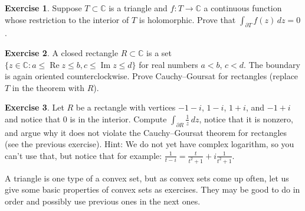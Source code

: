 \documentclass[12pt,openany]{book}
\renewcommand{\Re}{\operatorname{Re}}
\renewcommand{\Im}{\operatorname{Im}}
\newcommand{\C}{{\mathbb{C}}}
\theoremstyle{plain}
\theoremstyle{remark}
\theoremstyle{definition}
\newenvironment{exbox}{%
    \def\FrameCommand{\vrule width 1pt \relax\hspace {10pt}}%
    \MakeFramed {\advance \hsize -\width \FrameRestore }%
}{%
    \endMakeFramed
}
\theoremstyle{exercise}
\newtheorem{exercise}{Exercise}[section]
\theoremstyle{example}
\begin{document}
\begin{exbox}
\begin{exercise}
Suppose $T \subset \C$ is a triangle and $f \colon T \to \C$ a
continuous function whose restriction to the interior of $T$ is holomorphic.
Prove that $\int_{\partial T} f(z) \, dz = 0$.
\end{exercise}

\begin{exercise}
A closed rectangle $R \subset \C$ is a set
$\bigl\{ z \in \C : a \leq \Re z \leq b , c \leq \Im z \leq d \bigr\}$
for real numbers $a < b$, $c < d$.  The boundary
is again oriented counterclockwise.  Prove Cauchy--Goursat for rectangles
(replace $T$ in the theorem with $R$).
\end{exercise}

\begin{exercise}
Let $R$ be a rectangle with vertices
$-1-i$, $1-i$, $1+i$, and $-1+i$ and notice that $0$ is in the interior.
Compute $\int_{\partial R} \frac{1}{z} \, dz$,
notice that it is nonzero, and argue why it does not violate the
Cauchy--Goursat theorem for rectangles (see the previous exercise).
Hint: We do not yet have complex logarithm, so you can't use that,
but notice that for example:
$\frac{1}{t-i} = \frac{t}{t^2+1} + i \frac{1}{t^2+1}$.
\end{exercise}
\end{exbox}

A triangle is one type of a convex set, but as convex sets come up
often, let us give some basic properties of convex sets as exercises.
They may be good to do in order and possibly use previous ones in the next
ones.
\end{document}
